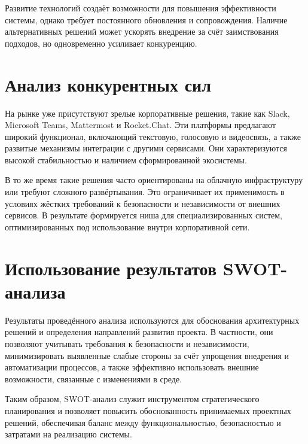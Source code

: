 \documentclass[14pt,a4paper]{extarticle}
\begin{document}
Развитие технологий создаёт возможности для повышения эффективности системы, однако требует постоянного обновления и сопровождения. Наличие альтернативных решений может ускорять внедрение за счёт заимствования подходов, но одновременно усиливает конкуренцию.

\section{Анализ конкурентных сил}

На рынке уже присутствуют зрелые корпоративные решения, такие как Slack, Microsoft Teams, Mattermost и Rocket.Chat. Эти платформы предлагают широкий функционал, включающий текстовую, голосовую и видеосвязь, а также развитые механизмы интеграции с другими сервисами. Они характеризуются высокой стабильностью и наличием сформированной экосистемы.

В то же время такие решения часто ориентированы на облачную инфраструктуру или требуют сложного развёртывания. Это ограничивает их применимость в условиях жёстких требований к безопасности и независимости от внешних сервисов. В результате формируется ниша для специализированных систем, оптимизированных под использование внутри корпоративной сети.

\section{Использование результатов SWOT-анализа}

Результаты проведённого анализа используются для обоснования архитектурных решений и определения направлений развития проекта. В частности, они позволяют учитывать требования к безопасности и независимости, минимизировать выявленные слабые стороны за счёт упрощения внедрения и автоматизации процессов, а также эффективно использовать внешние возможности, связанные с изменениями в среде.

Таким образом, SWOT-анализ служит инструментом стратегического планирования и позволяет повысить обоснованность принимаемых проектных решений, обеспечивая баланс между функциональностью, безопасностью и затратами на реализацию системы.
\end{document}
